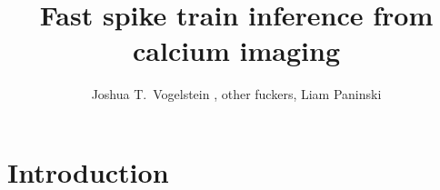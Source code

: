 \documentclass[12pt]{article}
\title{Fast spike train inference from calcium imaging}
\author{
Joshua T.~Vogelstein%
, other fuckers, Liam Paninski\\
}
\begin{document}
\maketitle

\begin{abstract}
\end{abstract}

\section{Introduction}
\end{document}
